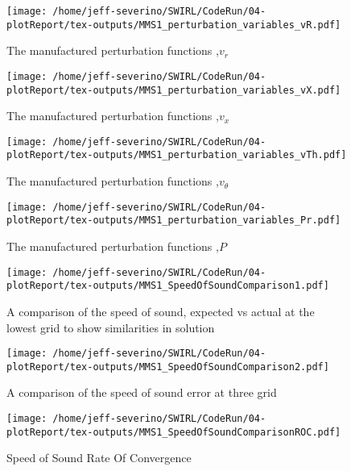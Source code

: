 \begin{figure}[!]
    \centering
    \texttt{[image: /home/jeff-severino/SWIRL/CodeRun/04-plotReport/tex-outputs/MMS1\_perturbation\_variables\_vR.pdf]}
\caption{The manufactured perturbation functions ,$v_r$}%
    \label{fig:1a}
\end{figure}


\begin{figure}[!]
    \centering
    \texttt{[image: /home/jeff-severino/SWIRL/CodeRun/04-plotReport/tex-outputs/MMS1\_perturbation\_variables\_vX.pdf]}
\caption{The manufactured perturbation functions ,$v_x$}%
    \label{fig:2a}
\end{figure}


\begin{figure}[!]
    \centering
    \texttt{[image: /home/jeff-severino/SWIRL/CodeRun/04-plotReport/tex-outputs/MMS1\_perturbation\_variables\_vTh.pdf]}
    \caption{The manufactured perturbation functions ,$v_{\theta}$}%
    \label{fig:3a}
\end{figure}


\begin{figure}[!]
    \centering
    \texttt{[image: /home/jeff-severino/SWIRL/CodeRun/04-plotReport/tex-outputs/MMS1\_perturbation\_variables\_Pr.pdf]}
\caption{The manufactured perturbation functions ,$P$}%
    \label{fig:4a}
\end{figure}

\begin{figure}[!]
    \centering
    \texttt{[image: /home/jeff-severino/SWIRL/CodeRun/04-plotReport/tex-outputs/MMS1\_SpeedOfSoundComparison1.pdf]}
    \caption{ A comparison of the speed of sound, expected vs actual at the lowest grid to show similarities in solution}
    \label{fig:5}
\end{figure}


\begin{figure}[!]
    \centering
    \texttt{[image: /home/jeff-severino/SWIRL/CodeRun/04-plotReport/tex-outputs/MMS1\_SpeedOfSoundComparison2.pdf]}
    \caption{ A comparison of the speed of sound error at three grid}
    \label{fig:5a}
\end{figure}


\begin{figure}[!]
    \centering
    \texttt{[image: /home/jeff-severino/SWIRL/CodeRun/04-plotReport/tex-outputs/MMS1\_SpeedOfSoundComparisonROC.pdf]}
    \caption{ Speed of Sound Rate Of Convergence}
    \label{fig:SpeedOfSoundROC}
\end{figure}



